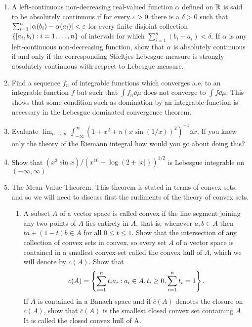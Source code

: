 \begin{enumerate}[label=\arabic*),ref=\arabic*]
\item A left-continuous non-decreasing real-valued function $\alpha$ defined on $\mathbb{R}$ is said to be absolutely continuous if for every $\varepsilon>0$ there is a $\delta>0$ such that $\sum_{i=1}^n|\alpha(b_i)-\alpha(a_i)|<\varepsilon$ for every finite disjoint collection $\left\{[a_i, b_i): i=1,\dots, n\right\}$ of intervals for which $\sum_{i=1}^n(b_i-a_i)<\delta$. If $\alpha$ is any left-continuous non-decreasing function, show that $\alpha$ is absolutely continuous if and only if the corresponding Stieltjes-Lebesgue measure is strongly absolutely continuous with respect to Lebesgue measure.

\item Find a sequence $f_n$ of integrable functions which converges a.e. to an integrable function $f$ but such that $\int f_n\dd\mu$ does not converge to $\int f\dd\mu$. This shows that some condition such as domination by an integrable function is necessary in the Lebesgue dominated convergence theorem.

\item Evaluate $\lim_{n\to\infty}\int_{-\infty}^\infty(1+x^2+n(x\sin(1/x))^2)^{-1}\dd x$. If you knew only the theory of the Riemann integral how would you go about doing this?

\item Show that $(x^3 \sin x)/(x^{10}+\log(2+|x|))^{1/2}$ is Lebesgue integrable on $(-\infty,\infty)$

\item\label{exer:mvt}
The Mean Value Theorem: This theorem is stated in terms of convex sets, and so we will need to discuss first the rudiments of the theory of convex sets.
\begin{enumerate}[label=\alph*)]
    \item A subset $A$ of a vector space is called convex if the line segment joining any two points of $A$ lies entirely in $A$, that is, whenever $a,b\in A$ then $ta+(1-t)b \in A$ for all $0\leq t\leq1$. Show that the intersection of any collection of convex sets in convex, so every set $A$ of a vector space is contained in a smallest convex set called the convex hull of $A$, which we will denote by $c(A)$. Show that $$c(A)=\left\{\sum_{i=1}^nt_ia_i:a_i \in A,t_i\geq0,\sum_{i=1}^nt_i=1\right\}.$$ If $A$ is contained in a Banach space and if $\overline{c}(A)$ denotes the closure on $c(A)$, show that $\overline{c}(A)$ is the smallest closed convex set containing $A$. It is called the closed convex hull of A.
    

\end{enumerate}
\end{enumerate}
